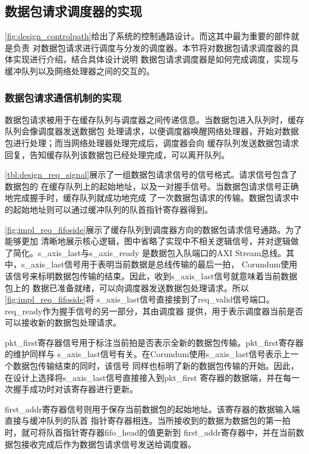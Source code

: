 \subsection{数据包请求调度器的实现}

\autoref{fig:design_controlpath}给出了系统的控制通路设计。而这其中最为重要的部件就是负责
对数据包请求进行调度与分发的调度器。本节将对数据包请求调度器的具体实现进行介绍，结合具体设计说明
数据包请求调度器是如何完成调度，实现与缓冲队列以及网络处理器之间的交互的。

\subsubsection{数据包请求通信机制的实现}

数据包请求被用于在缓存队列与调度器之间传递信息。当数据包进入队列时，缓存队列会像调度器发送数据包
处理请求，以便调度器唤醒网络处理器，开始对数据包进行处理；而当网络处理器处理完成后，调度器会向
缓存队列发送数据包请求回复，告知缓存队列该数据包已经处理完成，可以离开队列。

\autoref{tbl:design_req_signal}展示了一组数据包请求信号的信号格式。请求信号包含了数据包的
在缓存队列上的起始地址，以及一对握手信号。当数据包请求信号正确地完成握手时，缓存队列就成功地完成
了一次数据包请求的传输。数据包请求中的起始地址则可以通过缓冲队列的队首指针寄存器得到。


\autoref{fig:impl_req_fifoside}展示了缓存队列到调度器方向的数据包请求信号通路。为了能够更加
清晰地展示核心逻辑，图中省略了实现中不相关逻辑信号，并对逻辑做了简化。s\_axis\_last与s\_axis\_ready
是数据包入队端口的AXI Stream总线。其中，s\_axis\_last信号用于表明当前数据是总线传输的最后一拍\cite{arm2011axi}，
Corundum使用该信号来标明数据包传输的结束。因此，收到s\_axis\_last信号就意味着当前数据包上的
数据已准备就绪，可以向调度器发送数据包处理请求。所以\autoref{fig:impl_req_fifoside}将
s\_axis\_last信号直接接到了req\_valid信号端口。req\_ready作为握手信号的另一部分，其由调度器
提供，用于表示调度器当前是否可以接收新的数据包处理请求。

pkt\_first寄存器信号用于标注当前拍是否表示全新的数据包传输。pkt\_first寄存器的维护同样与
s\_axis\_last信号有关。在Corundum使用s\_axis\_last信号表示上一个数据包传输结束的同时，该信号
同样也标明了新的数据包传输的开始。因此，在设计上选择将s\_axis\_last信号直接接入到pkt\_first
寄存器的数据端，并在每一次握手成功时对该寄存器进行更新。

first\_addr寄存器信号则用于保存当前数据包的起始地址。该寄存器的数据输入端直接与缓冲队列的队首
指针寄存器相连。当所接收到的数据为数据包的第一拍时，就可将队首指针寄存器fifo\_head的值更新到
first\_addr寄存器中，并在当前数据包接收完成后作为数据包请求信号发送给调度器。

